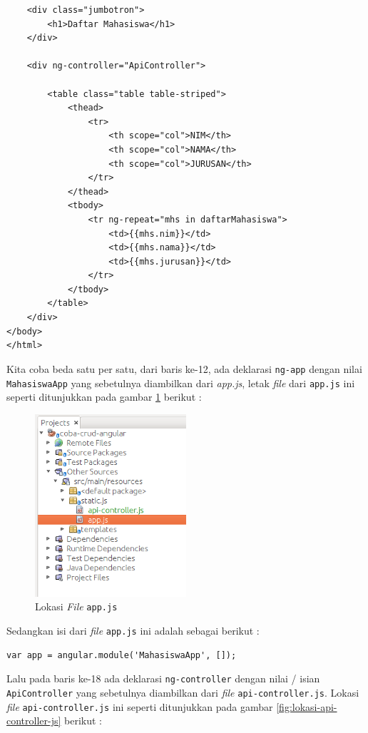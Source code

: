 \begin{enumerate}
\begin{lstlisting}
    <div class="jumbotron">
        <h1>Daftar Mahasiswa</h1>
    </div>

    <div ng-controller="ApiController">

        <table class="table table-striped">
            <thead>
                <tr>
                    <th scope="col">NIM</th>
                    <th scope="col">NAMA</th>
                    <th scope="col">JURUSAN</th>
                </tr>
            </thead>
            <tbody>
                <tr ng-repeat="mhs in daftarMahasiswa">
                    <td>{{mhs.nim}}</td>
                    <td>{{mhs.nama}}</td>
                    <td>{{mhs.jurusan}}</td>
                </tr>
            </tbody>            
        </table>
    </div>
</body>
</html>
	\end{lstlisting}	
	
	Kita coba beda satu per satu, dari baris ke-12, ada deklarasi \texttt{ng-app} dengan nilai \texttt{MahasiswaApp} yang sebetulnya diambilkan dari \textit{app.js}, letak \textit{file} dari \texttt{app.js} ini seperti ditunjukkan pada gambar \ref{fig:lokasi-app-js} berikut :
	
	\begin{figure}[H]
		\centering
		\includegraphics[width=0.5\textwidth]{./resources/029-lokasi-app-js}
		\caption{Lokasi \textit{File} \texttt{app.js}}
		\label{fig:lokasi-app-js}
	\end{figure}
	
	Sedangkan isi dari \textit{file} \texttt{app.js} ini adalah sebagai berikut :
	
	\begin{lstlisting}
var app = angular.module('MahasiswaApp', []);
	\end{lstlisting}
	
	Lalu pada baris ke-18 ada deklarasi \texttt{ng-controller} dengan nilai / isian \texttt{ApiController} yang sebetulnya diambilkan dari \textit{file} \texttt{api-controller.js}. Lokasi \textit{file} \texttt{api-controller.js} ini seperti ditunjukkan pada gambar \ref{fig:lokasi-api-controller-js} berikut :
	

\end{enumerate}
